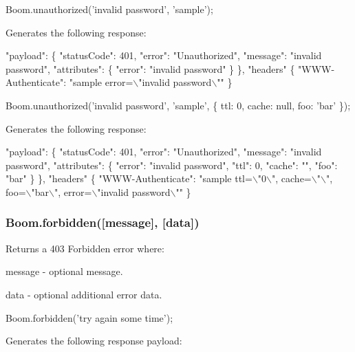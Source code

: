 \begin{DoxyCode}
Boom.unauthorized('invalid password', 'sample');
\end{DoxyCode}


Generates the following response\+:


\begin{DoxyCode}
"payload": \{
    "statusCode": 401,
    "error": "Unauthorized",
    "message": "invalid password",
    "attributes": \{
        "error": "invalid password"
    \}
\},
"headers" \{
  "WWW-Authenticate": "sample error=\(\backslash\)"invalid password\(\backslash\)""
\}
\end{DoxyCode}



\begin{DoxyCode}
Boom.unauthorized('invalid password', 'sample', \{ ttl: 0, cache: null, foo: 'bar' \});
\end{DoxyCode}


Generates the following response\+:


\begin{DoxyCode}
"payload": \{
    "statusCode": 401,
    "error": "Unauthorized",
    "message": "invalid password",
    "attributes": \{
        "error": "invalid password",
        "ttl": 0,
        "cache": "",
        "foo": "bar"
    \}
\},
"headers" \{
  "WWW-Authenticate": "sample ttl=\(\backslash\)"0\(\backslash\)", cache=\(\backslash\)"\(\backslash\)", foo=\(\backslash\)"bar\(\backslash\)", error=\(\backslash\)"invalid password\(\backslash\)""
\}
\end{DoxyCode}


\subsubsection*{{\ttfamily Boom.\+forbidden(\mbox{[}message\mbox{]}, \mbox{[}data\mbox{]})}}

Returns a 403 Forbidden error where\+:
\begin{DoxyItemize}
\item {\ttfamily message} -\/ optional message.
\item {\ttfamily data} -\/ optional additional error data.
\end{DoxyItemize}


\begin{DoxyCode}
Boom.forbidden('try again some time');
\end{DoxyCode}


Generates the following response payload\+:


